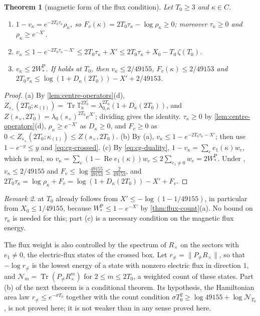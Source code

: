 \documentclass[11pt,a4paper]{amsart}
\newtheorem{theorem}{Theorem}[section]
\theoremstyle{definition}
\theoremstyle{remark}
\newtheorem{remark}[theorem]{Remark}
\numberwithin{equation}{section}
\DeclareMathOperator{\Tr}{Tr}        %
\newcommand{\norm}[1]{\lVert #1\rVert}     %
\newcommand{\TT}{\mathbb{T}}               %
\newcommand{\Zpart}[2]{Z(#1,#2)}           %
\newcommand{\lzero}{\lambda_0}             %
\newcommand{\Mcirc}{\text{\upshape(M$^{\circ}$)}}   %
\newcommand{\hypP}{\text{\upshape(P)}}              %
\begin{document}
\begin{theorem}[magnetic form of the flux condition]\label{thm:magnetic-P}
Let $T_0\ge3$ and $\kappa\in C$.
\begin{enumerate}[label=\textup{(\alph*)},leftmargin=*]
\item $1-v_\kappa=e^{-2T_0\tau_\kappa}\rho_\kappa$, so $F_v(\kappa)=2T_0\tau_\kappa-\log\rho_\kappa\ge0$; moreover $\tau_\kappa\ge0$ and $\rho_\kappa\ge e^{-X'}$.
\item $v_\kappa\le1-e^{-2T_0\tau_\kappa-X'}\le2T_0\tau_\kappa+X'\le2T_0\tau_\kappa+X_0-T_0\,\zeta(T_0)$.
\item $v_\kappa\le2W^{\mathrm P}_*$. If \hypP{} holds at $T_0$, then $v_\kappa\le2/49155$, $F_v(\kappa)\le2/49153$ and $2T_0\tau_\kappa\le\log(1+D_\kappa(2T_0))-X'+2/49153$.
\end{enumerate}
\end{theorem}

\begin{proof}
(a) By \cref{lem:centre-operators}\textup{(d)}, $Z_{s_\times}(2T_0;\kappa_{(1)})=\Tr\TT_\kappa^{2T_0}=\lambda_{0,\kappa}^{2T_0}(1+D_\kappa(2T_0))$, and $\Zpart{s_\times}{2T_0}=\lzero(s_\times)^{2T_0}e^{X'}$; dividing gives the identity. $\tau_\kappa\ge0$ by \cref{lem:centre-operators}\textup{(d)}, $\rho_\kappa\ge e^{-X'}$ as $D_\kappa\ge0$, and $F_v\ge0$ as $0<Z_{s_\times}(2T_0;\kappa_{(1)})\le\Zpart{s_\times}{2T_0}$. (b) By (a), $v_\kappa\le1-e^{-2T_0\tau_\kappa-X'}$; then use $1-e^{-y}\le y$ and \eqref{eq:cg-crossed}. (c) By \eqref{eq:cg-duality}, $1-v_\kappa=\sum_ee_1(\kappa)w_e$, which is real, so $v_\kappa=\sum_e(1-\operatorname{Re}e_1(\kappa))w_e\le2\sum_{e_1\ne0}w_e=2W^{\mathrm P}_*$. Under \hypP, $v_\kappa\le2/49155$ and $F_v\le\log\frac{49155}{49153}\le\frac2{49153}$, and $2T_0\tau_\kappa=\log\rho_\kappa+F_v=\log(1+D_\kappa(2T_0))-X'+F_v$.
\end{proof}

\begin{remark}
\hypP{} at $T_0$ already follows from $X'\le-\log(1-1/49155)$, in particular from $X_0\le1/49155$, because $W^{\mathrm P}_*\le1-e^{-X'}$ by \cref{thm:flux-count}\textup{(a)}. No bound on $\tau_\kappa$ is needed for this; part (c) is a necessary condition on the magnetic flux energy.
\end{remark}

The flux weight is also controlled by the spectrum of $R_\times$ on the sectors with $e_1\ne0$, the electric-flux states of the crossed box. Let $r_{\ne}=\norm{P_{\ne}R_\times}$, so that $-\log r_{\ne}$ is the lowest energy of a state with nonzero electric flux in direction $1$, and $\mathcal N_m=\Tr(P_{\ne}R_\times^m)$ for $2\le m\le2T_0$, a weighted count of these states. Part (b) of the next theorem is a conditional theorem. Its hypothesis, the Hamiltonian area law $r_{\ne}\le e^{-\sigma T_0}$ together with the count condition $\sigma T_0^2\ge\log49155+\log\mathcal N_{T_0}$, is not proved here; it is not weaker than \Mcirc{} in any sense proved here.
\end{document}
